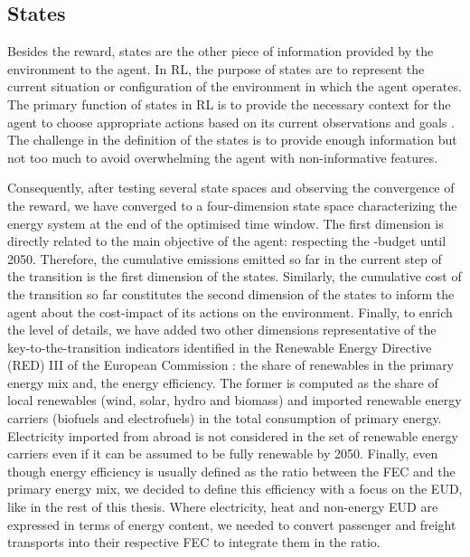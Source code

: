 \subsection{States}
\label{subsec:RL:act_states_rew:states}

Besides the reward, states are the other piece of information provided by the environment to the agent. In \gls{RL}, the purpose of states are to represent the current situation or configuration of the environment in which the agent operates. The primary function of states in RL is to provide the necessary context for the agent to choose appropriate actions based on its current observations and goals \cite{sutton2018reinforcement}. The challenge in the definition of the states is to provide enough information but not too much to avoid overwhelming the agent with non-informative features. 

Consequently, after testing several state spaces and observing the convergence of the reward, we have converged to a four-dimension state space characterizing the energy system at the end of the optimised time window. The first dimension is directly related to the main objective of the agent: respecting the -budget until 2050. Therefore, the cumulative emissions emitted so far in the current step of the transition is the first dimension of the states. Similarly, the cumulative cost of the transition so far constitutes the second dimension of the states to inform the agent about the cost-impact of its actions on the environment. Finally, to enrich the level of details, we have added two other dimensions representative of the key-to-the-transition indicators identified in the Renewable Energy Directive (RED) III of the European Commission \cite{REDIII}: the share of renewables in the primary energy mix and, the energy efficiency. The former is computed as the share of local renewables (\ie wind, solar, hydro and biomass) and imported renewable energy carriers (\ie biofuels and electrofuels) in the total consumption of primary energy. Electricity imported from abroad is not considered in the set of renewable energy carriers even if it can be assumed to be fully renewable by 2050. Finally, even though energy efficiency is usually defined as the ratio between the \gls{FEC} and the primary energy mix, we decided to define this efficiency with a focus on the \gls{EUD}, like in the rest of this thesis. Where electricity, heat and non-energy \gls{EUD} are expressed in terms of energy content, we needed to convert passenger and freight transports into their respective \gls{FEC} to integrate them in the ratio. 

